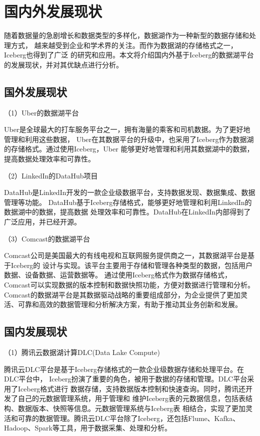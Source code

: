 \section{国内外发展现状}

随着数据量的急剧增长和数据类型的多样化，数据湖作为一种新型的数据存储和处理方式，
越来越受到企业和学术界的关注。而作为数据湖的存储格式之一，Iceberg也得到了广泛
的研究和应用。本文将介绍国内外基于Iceberg的数据湖平台的发展现状，并对其优缺点进行分析。

\subsection{国外发展现状}

（1）Uber的数据湖平台

Uber是全球最大的打车服务平台之一，拥有海量的乘客和司机数据\cite{37}。为了更好地管理和利用这些数据，
Uber在其数据平台的升级中，也采用了Iceberg作为数据湖的存储格式。通过使用Iceberg，Uber
能够更好地管理和利用其数据湖中的数据，提高数据处理效率和可靠性。

（2）LinkedIn的DataHub项目

DataHub是LinkedIn开发的一款企业级数据平台，支持数据发现、数据集成、数据管理等功能\cite{38}。
DataHub基于Iceberg存储格式，能够更好地管理和利用LinkedIn的数据湖中的数据，提高数据
处理效率和可靠性。DataHub在LinkedIn内部得到了广泛应用，并已经开源。

（3）Comcast的数据湖平台

Comcast公司是美国最大的有线电视和互联网服务提供商之一，其数据湖平台是基于Iceberg的
设计与实现。该平台主要用于存储和管理各种类型的数据，包括用户数据、设备数据、运营数据等。
通过使用Iceberg格式作为数据存储格式，Comcast可以实现数据的版本控制和数据快照功能，方便对数据进行管理和分析。
Comcast的数据湖平台是其数据驱动战略的重要组成部分，为企业提供了更加灵活、可靠和高效的数据管理和分析解决方案，有助于推动其业务创新和发展。

\subsection{国内发展现状}

（1）腾讯云数据湖计算DLC(Data Lake Compute)

腾讯云DLC平台是基于Iceberg存储格式的一款企业级数据存储和处理平台。在DLC平台中，
Iceberg扮演了重要的角色，被用于数据的存储和管理。DLC平台采用了Iceberg格式进行
数据存储，支持数据版本控制和快速查询。同时，腾讯还开发了自己的元数据管理系统，用于管理和
维护Iceberg表的元数据信息，包括表结构、数据版本、快照等信息。元数据管理系统与Iceberg表
相结合，实现了更加灵活和可靠的数据管理。腾讯云DLC平台除了Iceberg，还包括Flume、Kafka、
Hadoop、Spark等工具，用于数据采集、处理和分析。

